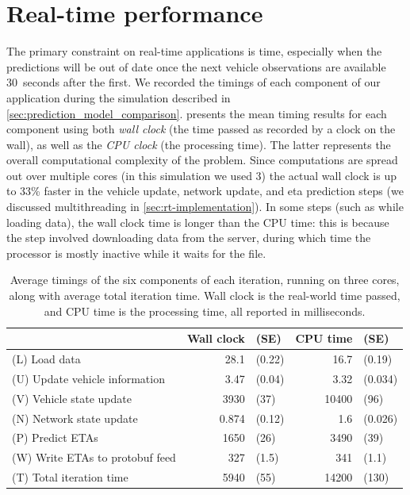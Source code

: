 \section{Real-time performance}
\label{sec:prediction_performance}

The primary constraint on real-time applications is time, especially when the predictions will be out of date once the next vehicle observations are available 30~seconds after the first. We recorded the timings of each component of our application during the simulation described in \cref{sec:prediction_model_comparison}.  presents the mean timing results for each component using both \emph{wall clock} (the time passed as recorded by a clock on the wall), as well as the \emph{CPU clock} (the processing time). The latter represents the overall computational complexity of the problem. Since computations are spread out over multiple cores (in this simulation we used 3)  the actual wall clock is up to 33\% faster in the vehicle update, network update, and \gls{eta} prediction steps (we discussed multithreading in \cref{sec:rt-implementation}). In some steps (such as while loading data), the wall clock time is longer than the CPU time: this is because the step involved downloading data from the server, during which time the processor is mostly inactive while it waits for the file.



\begin{knitrout}\small
{}\color{fgcolor}\begin{table}

\caption[Average timings of the six components of each iteration, running on three cores, along with average total iteration time]{\label{tab:prediction_timing}Average timings of the six components of each iteration, running on three cores, along with average total iteration time. Wall clock is the real-world time passed, and CPU time is the processing time, all reported in milliseconds.}
\centering
\fontsize{8}{10}\selectfont
\begin{tabular}[t]{lrlrl}
\toprule
 & Wall clock & (SE) & CPU time & (SE)\\
\midrule
(L) Load data & 28.1 & (0.22) & 16.7 & (0.19)\\
(U) Update vehicle information & 3.47 & (0.04) & 3.32 & (0.034)\\
(V) Vehicle state update & 3930 & (37) & 10400 & (96)\\
(N) Network state update & 0.874 & (0.12) & 1.6 & (0.026)\\
(P) Predict ETAs & 1650 & (26) & 3490 & (39)\\
\addlinespace
(W) Write ETAs to protobuf feed & 327 & (1.5) & 341 & (1.1)\\
\midrule
(T) Total iteration time & 5940 & (55) & 14200 & (130)\\
\bottomrule
\end{tabular}
\end{table}


\end{knitrout}


